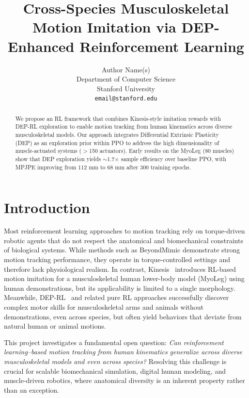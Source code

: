 \documentclass{article}
\title{Cross-Species Musculoskeletal Motion Imitation via DEP-Enhanced Reinforcement Learning}
\author{
  Author Name(s) \\
  Department of Computer Science \\
  Stanford University \\
  \texttt{email@stanford.edu}
}
\begin{document}
\maketitle

\begin{abstract}
We propose an RL framework that combines Kinesis-style imitation rewards with DEP-RL exploration to enable motion tracking from human kinematics across diverse musculoskeletal models. Our approach integrates Differential Extrinsic Plasticity (DEP) as an exploration prior within PPO to address the high dimensionality of muscle-actuated systems ($>$150 actuators). Early results on the MyoLeg (80 muscles) show that DEP exploration yields $\sim$1.7$\times$ sample efficiency over baseline PPO, with MPJPE improving from 112 mm to 68 mm after 300 training epochs.
\end{abstract}

\section{Introduction}

Most reinforcement learning approaches to motion tracking rely on torque-driven robotic agents that do not respect the anatomical and biomechanical constraints of biological systems. While methods such as BeyondMimic demonstrate strong motion tracking performance, they operate in torque-controlled settings and therefore lack physiological realism. In contrast, Kinesis~\cite{kinesis2024} introduces RL-based motion imitation for a musculoskeletal human lower-body model (MyoLeg) using human demonstrations, but its applicability is limited to a single morphology. Meanwhile, DEP-RL~\cite{deprl2023} and related pure RL approaches successfully discover complex motor skills for musculoskeletal arms and animals without demonstrations, even across species, but often yield behaviors that deviate from natural human or animal motions.

This project investigates a fundamental open question: \textit{Can reinforcement learning--based motion tracking from human kinematics generalize across diverse musculoskeletal models and even across species?} Resolving this challenge is crucial for scalable biomechanical simulation, digital human modeling, and muscle-driven robotics, where anatomical diversity is an inherent property rather than an exception.
\end{document}
